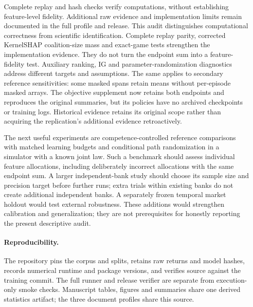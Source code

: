 \documentclass[10pt,twocolumn]{article}
\begin{document}
\ifdefined\shortversion
Complete replay and hash checks verify computations, without establishing
feature-level fidelity. Additional raw evidence and implementation limits
remain documented in the full profile and release.
\else
This audit distinguishes computational correctness from scientific
identification. Complete replay parity, corrected KernelSHAP coalition-size
mass and exact-game tests strengthen the implementation evidence. They do
not turn the endpoint sum into a feature-fidelity test. Auxiliary ranking,
IG and parameter-randomization diagnostics address different targets and
assumptions. The same applies to secondary reference sensitivities: some masked
spans retain means without per-episode masked arrays. The objective supplement
now retains both endpoints and reproduces the original summaries, but its
policies have no archived checkpoints or training logs. Historical evidence
retains its original scope rather than acquiring the replication's additional
evidence retroactively.
\fi

The next useful experiments are competence-controlled reference comparisons
with matched learning budgets and conditional path randomization in a simulator
with a known joint law. Such a benchmark should assess individual feature
allocations, including deliberately incorrect allocations with the same
endpoint sum. A larger independent-bank study should choose its sample size
and precision target before further runs; extra trials within existing banks
do not create additional independent banks.
A separately frozen temporal market holdout would test external
robustness. These additions would strengthen calibration and generalization;
they are not prerequisites for honestly reporting the present descriptive
audit.

\paragraph{Reproducibility.}
The repository pins the corpus and splits, retains raw returns and model
hashes, records numerical runtime and package versions, and verifies source
against the training commit. The full runner and release verifier are separate
from execution-only smoke checks. Manuscript tables, figures and summaries
share one derived statistics artifact; the three document profiles share this
source.

\ifdefined\extendedversion
\appendix
\end{document}
